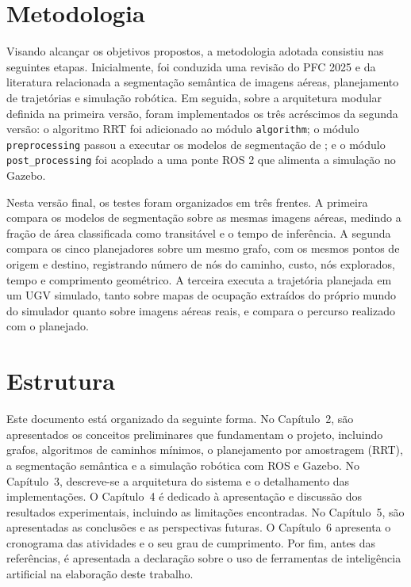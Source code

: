 \documentclass[
    12pt,
    openright,
    oneside,
    a4paper,
    english,
    brazil
]{abntex2}
\begin{document}
\section{Metodologia}

Visando alcançar os objetivos propostos, a metodologia adotada consistiu nas seguintes etapas. Inicialmente, foi conduzida uma revisão do PFC 2025 \cite{camelo2025} e da literatura relacionada a segmentação semântica de imagens aéreas, planejamento de trajetórias e simulação robótica. Em seguida, sobre a arquitetura modular definida na primeira versão, foram implementados os três acréscimos da segunda versão: o algoritmo RRT foi adicionado ao módulo \texttt{algorithm}; o módulo \texttt{preprocessing} passou a executar os modelos de segmentação de \cite{junior2024_models}; e o módulo \texttt{post\_processing} foi acoplado a uma ponte ROS 2 que alimenta a simulação no Gazebo.

Nesta versão final, os testes foram organizados em três frentes. A primeira compara os modelos de segmentação sobre as mesmas imagens aéreas, medindo a fração de área classificada como transitável e o tempo de inferência. A segunda compara os cinco planejadores sobre um mesmo grafo, com os mesmos pontos de origem e destino, registrando número de nós do caminho, custo, nós explorados, tempo e comprimento geométrico. A terceira executa a trajetória planejada em um UGV simulado, tanto sobre mapas de ocupação extraídos do próprio mundo do simulador quanto sobre imagens aéreas reais, e compara o percurso realizado com o planejado.

\section{Estrutura}

Este documento está organizado da seguinte forma. No Capítulo~2, são apresentados os conceitos preliminares que fundamentam o projeto, incluindo grafos, algoritmos de caminhos mínimos, o planejamento por amostragem (RRT), a segmentação semântica e a simulação robótica com ROS e Gazebo. No Capítulo~3, descreve-se a arquitetura do sistema e o detalhamento das implementações. O Capítulo~4 é dedicado à apresentação e discussão dos resultados experimentais, incluindo as limitações encontradas. No Capítulo~5, são apresentadas as conclusões e as perspectivas futuras. O Capítulo~6 apresenta o cronograma das atividades e o seu grau de cumprimento. Por fim, antes das referências, é apresentada a declaração sobre o uso de ferramentas de inteligência artificial na elaboração deste trabalho.
\end{document}
